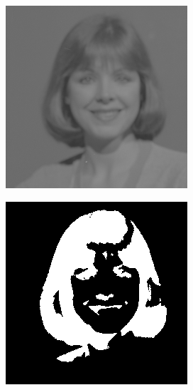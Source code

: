 \documentclass{article}
\begin{document}
\begin{figure}[H]
\begin{subfigure}{.3\textwidth}
  \centering
  \includegraphics[width=0.97\linewidth]{_Figures/sample_4.png}
  \caption{}
  \label{fig:tresh_raw_4}
\end{subfigure}%
\begin{subfigure}{.3\textwidth}
  \centering
  \includegraphics[width=0.97\linewidth]{_Figures/sample_4_good_treshold.png}

\end{subfigure}
\end{figure}
\end{document}
